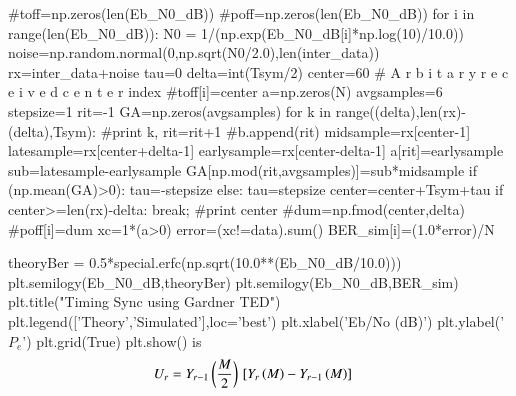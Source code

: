 \documentclass[journal,12pt,twocolumn]{IEEEtran}
\begin{document}
#toff=np.zeros(len(Eb_N0_dB))
#poff=np.zeros(len(Eb_N0_dB))
for i in range(len(Eb_N0_dB)):
    N0 = 1/(np.exp(Eb_N0_dB[i]*np.log(10)/10.0))
    noise=np.random.normal(0,np.sqrt(N0/2.0),len(inter_data))
    rx=inter_data+noise
    tau=0
    delta=int(Tsym/2)
    center=60   # A r b i t a r y  r e c e i v e d  c e n t e r index
    #toff[i]=center%
    a=np.zeros(N)    
    avgsamples=6
    stepsize=1
    rit=-1
    GA=np.zeros(avgsamples)
    for k in range((delta),len(rx)-(delta),Tsym):
        #print k,
        rit=rit+1
        #b.append(rit)
        midsample=rx[center-1]
        latesample=rx[center+delta-1]
        earlysample=rx[center-delta-1]
        a[rit]=earlysample
        sub=latesample-earlysample
        GA[np.mod(rit,avgsamples)]=sub*midsample
        if (np.mean(GA)>0):
            tau=-stepsize
        else:
            tau=stepsize
        center=center+Tsym+tau
        if center>=len(rx)-delta:
            break;
    #print center
    #dum=np.fmod(center,delta)
    #poff[i]=dum
    xc=1*(a>0)
    error=(xc!=data).sum()
    BER_sim[i]=(1.0*error)/N 
    
theoryBer = 0.5*special.erfc(np.sqrt(10.0**(Eb_N0_dB/10.0)))    
plt.semilogy(Eb_N0_dB,theoryBer)    
plt.semilogy(Eb_N0_dB,BER_sim) 
plt.title("Timing Sync using Gardner TED")
plt.legend(['Theory','Simulated'],loc='best')
plt.xlabel('Eb/No (dB)')
plt.ylabel('$P_e$')
plt.grid(True)
plt.show()
is
\begin{align}
U_r&=Y_{r-1}\left(\frac{M}{2}\right){}\left[Y_{r}\left(M\right)-Y_{r-1}\left(M\right)\right]
\end{align}

%
\end{document}

